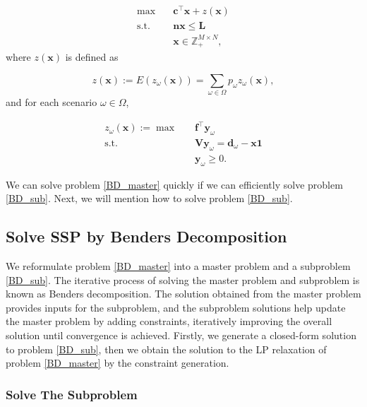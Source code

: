 \begin{equation}\label{BD_master}
\begin{aligned}
\max \quad & \mathbf{c}^{\intercal} \mathbf{x}+ z(\mathbf{x}) \\
\text {s.t.} \quad & \mathbf{n} \mathbf{x} \leq \mathbf{L} \\
& \mathbf{x} \in \mathbb{Z}_{+}^{M \times N},
\end{aligned}
\end{equation}
where $z(\mathbf{x})$ is defined as

$$z(\mathbf{x}) := E(z_{\omega}(\mathbf{x})) = \sum_{\omega \in \Omega} p_{\omega} z_{\omega}(\mathbf{x}),$$ and for each scenario $\omega \in \Omega$, 

\begin{equation}\label{BD_sub}
  \begin{aligned}
    z_{\omega}(\mathbf{x}) := \max \quad & \mathbf{f}^{\intercal} \mathbf{y}_{\omega} \\
    \text {s.t.} \quad & \mathbf{V} \mathbf{y}_{\omega} = \mathbf{d}_{\omega} - \mathbf{x} \mathbf{1} \\
     & \mathbf{y}_{\omega} \geq 0.
  \end{aligned}
\end{equation}


We can solve problem \eqref{BD_master} quickly if we can efficiently solve problem \eqref{BD_sub}. Next, we will mention how to solve problem \eqref{BD_sub}.

\subsection{Solve SSP by Benders Decomposition}\label{solve_by_benders}
We reformulate problem \eqref{BD_master} into a master problem and a subproblem \eqref{BD_sub}. The iterative process of solving the master problem and subproblem is known as Benders decomposition. 
The solution obtained from the master problem provides inputs for the subproblem, and the subproblem solutions help update the master problem by adding constraints, iteratively improving the overall solution until convergence is achieved. Firstly, we generate a closed-form solution to problem \eqref{BD_sub}, then we obtain the solution to the LP relaxation of problem \eqref{BD_master} by the constraint generation.


\subsubsection{Solve The Subproblem}\label{second_stage}

